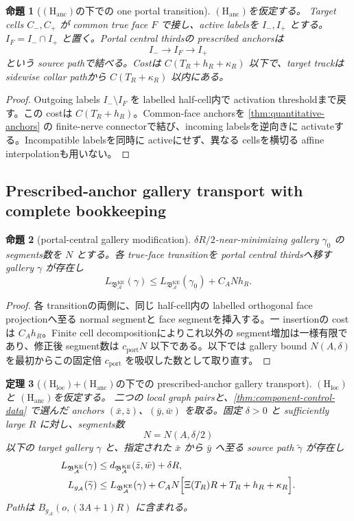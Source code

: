 \documentclass[11pt,a4paper]{ltjsarticle}
\newcommand{\cA}{\mathcal A}\newcommand{\cB}{\mathcal B}\newcommand{\cC}{\mathcal C}
\newcommand{\BKE}{\mathfrak B_{\cA}^{\mathrm{KE}}}
\newcommand{\Hloc}{\ensuremath{(\mathrm H_{\mathrm{loc}})}}
\newcommand{\Hanc}{\ensuremath{(\mathrm H_{\mathrm{anc}})}}
\theoremstyle{plain}
\newtheorem{theorem}{定理}[section]\newtheorem{proposition}[theorem]{命題}
\theoremstyle{definition}
\theoremstyle{remark}
\begin{document}
\begin{proposition}[\Hanc の下での one portal transition]\label{prop:add-remove-transition}
\Hanc を仮定する。
Target cells $C_-,C_+$ が common true face $F$ で接し、active labelsを $I_-,I_+$ とする。$I_F=I_-\cap I_+$ と置く。Portal central thirdsの prescribed anchorsは
\[
 I_-\longrightarrow I_F\longrightarrow I_+
\]
という source pathで結べる。Costは $C(T_R+h_R+\kappa_R)$ 以下で、target trackは sidewise collar pathから $C(T_R+\kappa_R)$ 以内にある。
\end{proposition}

\begin{proof}
Outgoing labels $I_-\setminus I_F$ を labelled half-cell内で activation thresholdまで戻す。この costは $C(T_R+h_R)$。Common-face anchorsを \cref{thm:quantitative-anchors} の finite-nerve connectorで結び、incoming labelsを逆向きに activateする。Incompatible labelsを同時に activeにせず、異なる cellsを横切る affine interpolationも用いない。
\end{proof}

\subsection{Prescribed-anchor gallery transport with complete bookkeeping}
\begin{proposition}[portal-central gallery modification]\label{prop:central-gallery-modification}
$\delta R/2$-near-minimizing gallery $\gamma_0$ の segments数を $N$ とする。各 true-face transitionを portal central thirdsへ移す gallery $\gamma$ が存在し
\[
 L_{\BKE}(\gamma)
 \le L_{\BKE}(\gamma_0)+C_A N h_R.
\]
\end{proposition}

\begin{proof}
各 transitionの両側に、同じ half-cell内の labelled orthogonal face projectionへ至る normal segmentと face segmentを挿入する。一 insertionの costは $C_Ah_R$。Finite cell decompositionによりこれ以外の segment増加は一様有限であり、修正後 segment数は $c_{\mathrm{port}}N$ 以下である。以下では gallery bound $N(A,\delta)$ を最初からこの固定倍 $c_{\mathrm{port}}$ を吸収した数として取り直す。
\end{proof}

\begin{theorem}[\Hloc+\Hanc の下での prescribed-anchor gallery transport]\label{thm:prescribed-gallery-lift}
\Hloc と \Hanc を仮定する。
二つの local graph pairsと、\cref{thm:component-control-data} で選んだ anchors $(\bar x,\bar z)$、$(\bar y,\bar w)$ を取る。固定 $\delta>0$ と sufficiently large $R$ に対し、segments数
\[
 N=N(A,\delta/2)
\]
以下の target gallery $\gamma$ と、指定された $\bar x$ から $\bar y$ へ至る source path $\widetilde\gamma$ が存在し
\begin{align}
 L_{\BKE}(\gamma)
 &\le d_{\BKE}(\bar z,\bar w)+\delta R,\label{eq:target-gallery-length-v17}\\
 L_{g_{\cA}}(\widetilde\gamma)
 &\le L_{\BKE}(\gamma)
 +C_AN\Bigl[\Xi(T_R)R+T_R+h_R+\kappa_R\Bigr].\label{eq:anchored-transport-error-v17}
\end{align}
Pathは $B_{g_{\cA}}(o,(3A+1)R)$ に含まれる。
\end{theorem}
\end{document}
